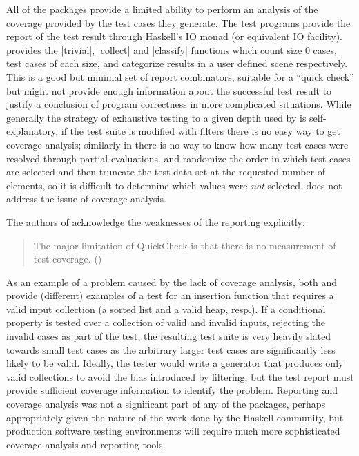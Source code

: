 All of the packages provide a limited ability to
perform an analysis of the coverage provided by the test cases they generate.
The test programs provide the report of the test result through Haskell's IO monad (or equivalent IO facility).
\QC provides the |trivial|, |collect| and |classify| functions which 
count size 0 cases, test cases of each size, 
and categorize results in a user defined scene respectively.
This is a good but minimal set of report combinators,
suitable for a ``quick check'' but might not provide enough information
about the successful test result to justify a conclusion of program correctness
in more complicated situations.
While generally the strategy of exhaustive testing 
to a given depth used by \SC is self-explanatory,
if the test suite is modified with filters there is no easy way to get coverage analysis;
similarly in \LSC there is no way to know how many test cases were resolved 
through partial evaluations.
\EC and \GAST randomize the order in which test cases are selected
and then truncate the test data set at the requested number of elements,
so it is difficult to determine which values were \emph{not} selected.
\FEAT does not address the issue of coverage analysis.

The authors of \QC acknowledge the weaknesses of the reporting explicitly:

\begin{quote} 
The major limitation of QuickCheck is that there is no measurement of test coverage. (\cite{Claessen2000})
\end{quote}

\noindent
As an example of a problem caused by the lack of coverage analysis, 
both \cite{Claessen2000} and \cite{EasyCheck2008} provide (different) examples
of a test for an insertion function that requires a valid input collection
(a sorted list and a valid heap, resp.).
If a conditional property is tested over a collection of valid and invalid inputs, 
rejecting the invalid cases as part of the test,
the resulting test suite is very heavily slated towards small test cases as 
the arbitrary larger test cases are significantly less likely to be valid.  
Ideally, the tester would write a generator that produces only valid collections
to avoid the bias introduced by filtering,
but the test report must provide sufficient coverage information to identify the problem.
Reporting and coverage analysis was not a significant part of any of the packages,
perhaps appropriately given the nature of the work done by the Haskell community,
but production software testing environments will require
much more sophisticated coverage analysis and reporting tools.

